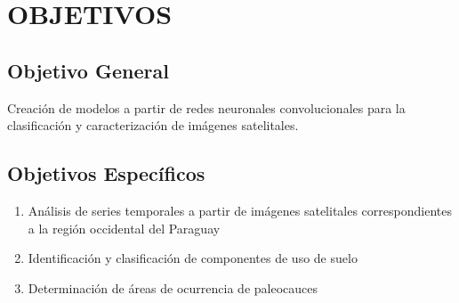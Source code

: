 \section{OBJETIVOS}

\subsection{Objetivo General}

Creación de modelos a partir de redes neuronales convolucionales para la clasificación y caracterización de imágenes satelitales.

\subsection{Objetivos Específicos}

\begin{enumerate}
    \item Análisis de series temporales a partir de imágenes satelitales correspondientes a la región occidental del Paraguay
    \item Identificación y clasificación de componentes de uso de suelo
    \item Determinación de áreas de ocurrencia de paleocauces
\end{enumerate}
